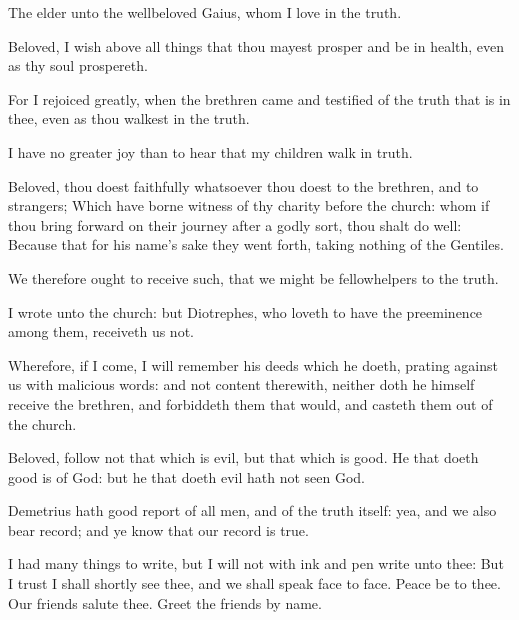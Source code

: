 \Chapter
\Verse The elder unto the wellbeloved Gaius, whom I love in the truth.

\Verse Beloved, I wish above all things that thou mayest prosper and be in health, even as thy soul prospereth.

\Verse For I rejoiced greatly, when the brethren came and testified of the truth that is in thee, even as thou walkest in the truth.

\Verse I have no greater joy than to hear that my children walk in truth.

\Verse Beloved, thou doest faithfully whatsoever thou doest to the brethren, and to strangers; \Verse Which have borne witness of thy charity before the church: whom if thou bring forward on their journey after a godly sort, thou shalt do well: \Verse Because that for his name's sake they went forth, taking nothing of the Gentiles.

\Verse We therefore ought to receive such, that we might be fellowhelpers to the truth.

\Verse I wrote unto the church: but Diotrephes, who loveth to have the preeminence among them, receiveth us not.

\Verse Wherefore, if I come, I will remember his deeds which he doeth, prating against us with malicious words: and not content therewith, neither doth he himself receive the brethren, and forbiddeth them that would, and casteth them out of the church.

\Verse Beloved, follow not that which is evil, but that which is good.  He that doeth good is of God: but he that doeth evil hath not seen God.

\Verse Demetrius hath good report of all men, and of the truth itself: yea, and we also bear record; and ye know that our record is true.

\Verse I had many things to write, but I will not with ink and pen write unto thee: \Verse But I trust I shall shortly see thee, and we shall speak face to face. Peace be to thee. Our friends salute thee. Greet the friends by name.

